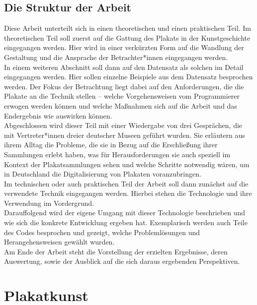 \documentclass[a4paper,12pt,ngerman]{article}
\begin{document}
\subsection{Die Struktur der Arbeit}
Diese Arbeit unterteilt sich in einen theoretischen und einen praktischen Teil. Im theoretischen Teil soll zuerst auf die Gattung des Plakats in der Kunstgeschichte eingegangen werden. Hier wird in einer verkürzten Form auf die Wandlung der Gestaltung und die Ansprache der Betrachter*innen eingegangen werden. \\
In einem weiteren Abschnitt soll dann auf den Datensatz als solchen im Detail eingegangen werden. Hier sollen einzelne Beispiele aus dem Datensatz besprochen werden. Der Fokus der Betrachtung liegt dabei auf den Anforderungen, die die Plakate an die Technik stellen – welche Vorgehensweisen vom Programmierer erwogen werden können und welche Maßnahmen sich auf die Arbeit und das Endergebnis wie auswirken können. \\
Abgeschlossen wird dieser Teil mit einer Wiedergabe von drei Gesprächen, die mit Vertreter*innen dreier deutscher Museen geführt wurden. Sie erläutern aus ihrem Alltag die Probleme, die sie in Bezug auf die Erschließung ihrer Sammlungen erlebt haben, was für Herausforderungen sie auch speziell im Kontext der Plakatsammlungen sehen und welche Schritte notwendig wären, um in Deutschland die Digitalisierung von Plakaten voranzubringen. \\
Im technischen oder auch praktischen Teil der Arbeit soll dann zunächst auf die verwendete Technik eingegangen werden. Hierbei stehen die Technologie und ihre Verwendung im Vordergrund. \\
Darauffolgend wird der eigene Umgang mit dieser Technologie beschrieben und wie sich die konkrete Entwicklung ergeben hat. Exemplarisch werden auch Teile des Codes besprochen und gezeigt, welche Problemlösungen und Herangehensweisen gewählt wurden. \\
Am Ende der Arbeit steht die Vorstellung der erzielten Ergebnisse, deren Auswertung, sowie der Ausblick auf die sich daraus ergebenden Perspektiven. \\

\newpage

\section{Plakatkunst}
\end{document}
